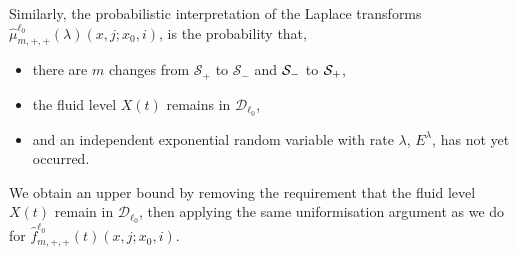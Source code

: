 Similarly, the probabilistic interpretation of the Laplace transforms \(\widehat \mu^{\ell_0}_{m,+,+}(\lambda)(x,j;x_0,i)\), is the probability that, 
\begin{itemize}
	\item there are \(m\) changes from \(\mathcal S_+\) to \(\mathcal S_-\) and \(\mathcal{S}_-\) to \(\mathcal{S}_+\), 
	\item the fluid level \(X(t)\) remains in \(\mathcal D_{\ell_0}\), 
	\item and an independent exponential random variable with rate \(\lambda\), \(E^\lambda\), has not yet occurred.
\end{itemize}
We obtain an upper bound by removing the requirement that the fluid level \(X(t)\) remain in \(\mathcal D_{\ell_0}\), then applying the same uniformisation argument as we do for \(\widehat f^{\ell_0}_{m,+,+}(t)(x,j;x_0,i)\).

